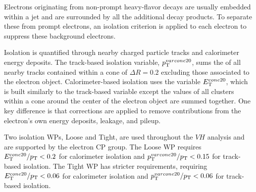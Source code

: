 Electrons originating from non-prompt heavy-flavor decays are usually embedded within a jet and are surrounded by all the additional decay products. To separate these from prompt electrons, an isolation criterion is applied to each electron to suppress these background electrons.

Isolation is quantified through nearby charged particle tracks and calorimeter energy deposits. The track-based isolation variable, $p_{\mathrm{T}}^{varcone20}$, sums the \pt{} of all nearby tracks contained within a cone of $\Delta R = 0.2$ excluding those associated to the electron object. Calorimeter-based isolation uses the variable $E_{\mathrm{T}}^{cone20}$, which is built similarly to the track-based variable except the \et{} values of all clusters within a cone around the center of the electron object are summed together. One key difference is that corrections are applied to remove contributions from the electron's own energy deposits, leakage, and pileup.

Two isolation WPs, Loose and Tight, are used throughout the $VH$ analysis and are supported by the electron CP group. The Loose WP requires $E_{\mathrm{T}}^{cone20}/p_{\mathrm{T}} < 0.2$ for calorimeter isolation and $p_{\mathrm{T}}^{varcone20}/p_{\mathrm{T}} < 0.15$ for track-based isolation. The Tight WP has stricter requirements, requiring $E_{\mathrm{T}}^{cone20}/p_{\mathrm{T}} < 0.06$ for calorimeter isolation and $p_{\mathrm{T}}^{varcone20}/p_{\mathrm{T}} < 0.06$ for track-based isolation. 